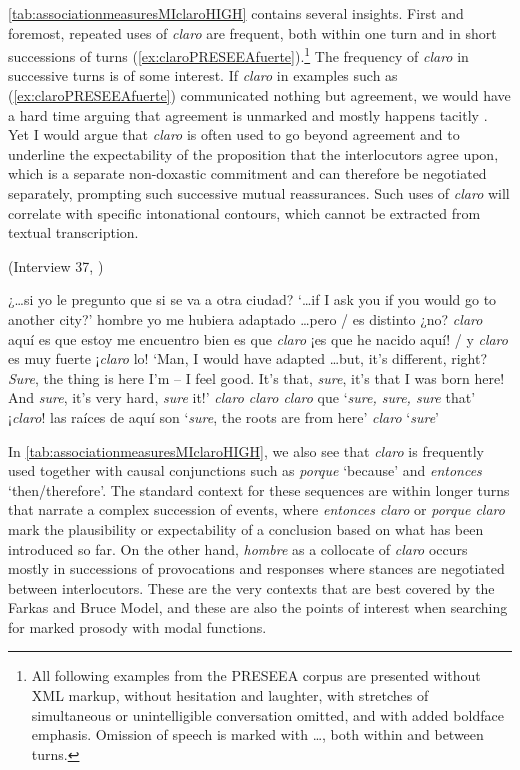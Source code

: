 \autoref{tab:associationmeasuresMIclaroHIGH} contains several insights. First and foremost, repeated uses of \textit{claro} are frequent, both within one turn and in short successions of turns (\ref{ex:claroPRESEEAfuerte}).\footnote{All following examples from the PRESEEA corpus are presented without XML markup, without hesitation and laughter, with stretches of simultaneous or unintelligible conversation omitted, and with added boldface emphasis. Omission of speech is marked with \ldots, both within and between turns.} The frequency of \textit{claro} in successive turns is of some interest. If \textit{claro} in examples such as (\ref{ex:claroPRESEEAfuerte}) communicated nothing but agreement, we would have a hard time arguing that agreement is unmarked and mostly happens tacitly \citep{FarkasBruce.2010}. Yet I would argue that \textit{claro} is often used to go beyond agreement and to underline the expectability of the proposition that the interlocutors agree upon, which is a separate non-doxastic commitment and can therefore be negotiated separately, prompting such successive mutual reassurances. Such uses of \textit{claro} will correlate with specific intonational contours, which cannot be extracted from textual transcription.

\begin{exe} 
		\ex (Interview 37, \cite{PRESEEA.20142020}) \label{ex:claroPRESEEAfuerte} 
		\begin{xlist}[A:]
		 ¿\ldots si yo le pregunto que si se va a otra ciudad?
		\glt `\ldots if I ask you if you would go to another city?'
		\sn[] {\ldots}
		 hombre yo me hubiera adaptado \ldots pero / es distinto ¿no? \textit{claro} aquí es que estoy me encuentro bien es que \textit{claro} ¡es que he nacido aquí! / y \textit{claro} es muy fuerte ¡\textit{claro} lo!
		\glt `Man, I would have adapted \ldots but, it's different, right? \textit{Sure}, the thing is here I'm -- I feel good. It's that, \textit{sure}, it's that I was born here! And \textit{sure}, it's very hard, \textit{sure} it!'
		\sn[] {\ldots} 
		\textit{claro claro claro} que
		\glt `\textit{sure, sure, sure} that'
		 ¡\textit{claro}! las raíces de aquí son 
		\glt `\textit{sure}, the roots are from here'
		 \textit{claro}
		\glt `\textit{sure}'
		\end{xlist}
	\end{exe}

In \autoref{tab:associationmeasuresMIclaroHIGH}, we also see that \textit{claro} is frequently used together with causal conjunctions such as \textit{porque} `because' and \textit{entonces} `then/therefore'. The standard context for these sequences are within longer turns that narrate a complex succession of events, where \textit{entonces claro}  or \textit{porque claro} mark the plausibility or expectability of a conclusion based on what has been introduced so far. On the other hand, \textit{hombre} as a collocate of \textit{claro} occurs mostly in successions of provocations and responses where stances are negotiated between interlocutors. These are the very contexts that are best covered by the Farkas and Bruce Model, and these are also the points of interest when searching for marked prosody with modal functions. 

